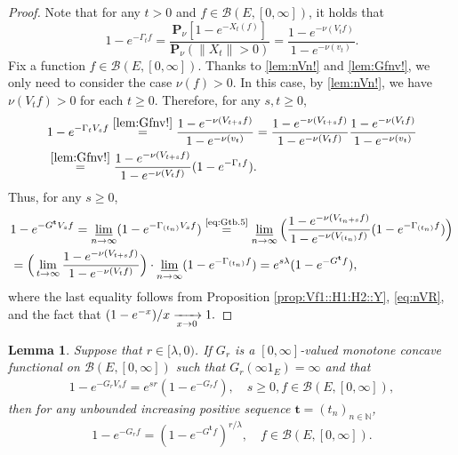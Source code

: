 \documentclass[12pt,a4paper]{amsart}
\numberwithin{equation}{section}
\theoremstyle{plain}
\newtheorem{lem}[thm]{Lemma}
\theoremstyle{definition}
\theoremstyle{remark}
\begin{document}
\begin{proof}
Note that for any $t>0$ and $f\in \mathcal B(E,[0,\infty])$, it holds that
\begin{equation}\label{lem:Gfnv!}
	1 - e^{- \Gamma_t f}
	= \frac{ \mathbf P_\nu [ 1 - e^{- X_t(f)}]}{ \mathbf P_\nu (\|X_t\| > 0)}
	= \frac{ 1 - e^{- \nu(V_tf)} }{ 1 - e^{- \nu(v_t)}}.
\end{equation}
Fix a function $f\in \mathcal B(E,[0,\infty])$.
Thanks to \eqref{lem:nVn!} and \eqref{lem:Gfnv!}, we only need to consider the case $\nu(f) > 0$.
	In this case, by \eqref{lem:nVn!}, we have $\nu(V_tf)>0$ for each $t\geq 0$.
	Therefore, for any $s,t\geq 0$,
	\begin{align}
	& 1 - e^{- \Gamma_t V_s f}
	\overset{\eqref{lem:Gfnv!}}= \frac{ 1 - e^{- \nu(V_{t+s} f)} }{ 1 - e^{- \nu(v_t)}}
	= \frac{ 1 - e^{- \nu(V_{t+s} f)} }{ 1 - e^{- \nu(V_tf)}} \frac{ 1 - e^{ - \nu(V_tf)}}{ 1 - e^{- \nu(v_t)}}
	\\ &  \label{eq:Gtb.5}\overset{\eqref{lem:Gfnv!}}= \frac{ 1 - e^{- \nu(V_{t+s} f)} }{ 1 - e^{- \nu(V_tf)}} ( 1 - e^{- \Gamma_t f}).
	\end{align}
	Thus, for any $s\geq 0$,
	\begin{align}
	& 1 - e^{- G^{\mathbf t} V_s f}
	= \varliminf_{n\to \infty} ( 1 - e^{- \Gamma_{(t_n)} V_s f})
	\overset{\text{\eqref{eq:Gtb.5}}}= \varliminf_{n\to \infty} \Big( \frac{ 1 - e^{- \nu(V_{t_n+s}f)}}{ 1 - e^{- \nu(V_{(t_n)}f)}} (1 - e^{- \Gamma_{(t_n)} f}) \Big)
	\\& = \Big( \lim_{t \to \infty} \frac{ 1 - e^{- \nu(V_{t+s}f)}}{ 1 - e^{- \nu(V_{t}f)}} \Big) \cdot \varliminf_{n\to \infty} (1 - e^{- \Gamma_{(t_n)} f} )
	= e^{s\lambda} (1 - e^{- G^{\mathbf t}f}),
	\end{align}
	where the last equality follows from Proposition \ref{prop:Vf1::H1:H2::Y}, \eqref{eq:nVR}, and the fact that
	$
	(1-e^{-x}) /x \xrightarrow[x\to 0]{} 1.
	\qedhere
	$
\end{proof}

\begin{lem} \label{prop:G*:H1:H2:H3:H4}
	Suppose that $r \in [\lambda,0)$.
	If $G_r$ is a $[0,\infty]$-valued monotone concave functional on $\mathcal B(E,[0,\infty])$ such that $G_r(\infty 1_E) = \infty$ and that
	\begin{align}
	1 - e^{-G_r V_s f}
	= e^{s r} (1 - e^{- G_r f}),
	\quad s\geq 0, f\in \mathcal B(E,[0,\infty]),
	\end{align}
	then for any unbounded increasing positive sequence $\mathbf t = (t_n)_{n\in \mathbb N}$,
\begin{equation}
	1 - e^{-G_r f} = (1 - e^{- G^\mathbf t f})^{r/\lambda}, \quad f \in \mathcal B(E,[0,\infty]).
\end{equation}
\end{lem}
\end{document}
